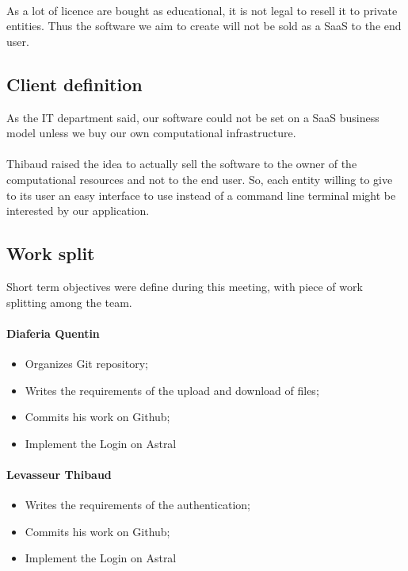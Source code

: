 \documentclass{cranfieldChart}
\begin{document}
\paragraph{} As a lot of licence are bought as educational, it is not legal to resell it to private entities. Thus the software we aim to create will not be sold as a SaaS to the end user.

\subsection*{Client definition}
As the IT department said, our software could not be set on a SaaS business model unless we buy our own computational infrastructure. 
\paragraph{}Thibaud raised the idea to actually sell the software to the owner of the computational resources and not to the end user. So, each entity willing to give to its user an easy interface to use instead of a command line terminal might be interested by our application.

\subsection*{Work split}
Short term objectives were define during this meeting, with piece of work splitting among the team.

\paragraph{Diaferia Quentin}
\begin{itemize}
	\item Organizes Git repository;
	\item Writes  the requirements of the upload and download of files;
	\item Commits his work on Github;
	\item Implement the Login on Astral
\end{itemize}

\paragraph{Levasseur Thibaud}
\begin{itemize}
	\item Writes  the requirements of the authentication;
	\item Commits his work on Github;
	\item Implement the Login on Astral
\end{itemize}
\end{document}
